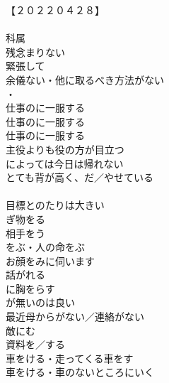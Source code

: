 【２０２２０４２８】\\

\\

科属\\

残念まりない\\

緊張して\\
余儀ない・他に取るべき方法がない\\
・\\
仕事のに一服する\\
仕事のに一服する\\
仕事のに一服する\\
主役よりも役の方が目立つ\\
によっては今日は帰れない\\
とても背が高く、だ／やせている\\

\\
目標とのたりは大きい\\

ぎ物をる\\
相手をう\\
をぶ・人の命をぶ\\
お顔をみに伺います\\

話がれる\\
に胸をらす\\

が無いのは良い\\
最近母からがない／連絡がない\\

敵にむ\\
資料を／する\\
車をける・走ってくる車をす\\
車をける・車のないところにいく\\

